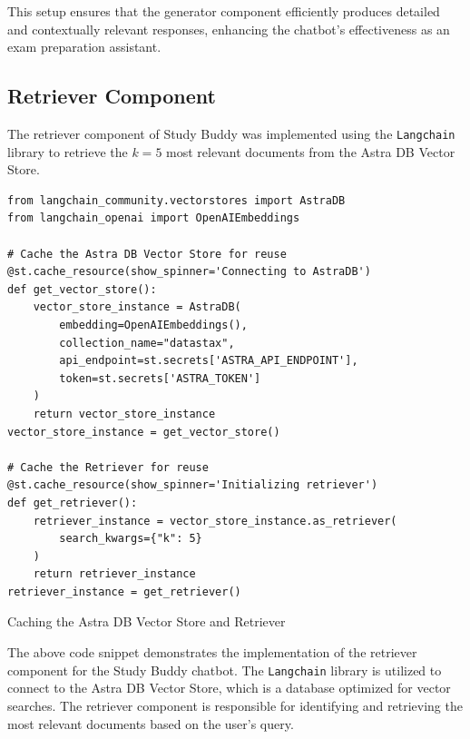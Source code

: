 This setup ensures that the generator component efficiently produces detailed and contextually relevant responses, enhancing the chatbot's effectiveness as an exam preparation assistant.

        
\subsection{Retriever Component}
The retriever component of Study Buddy was implemented using the \texttt{Langchain} library to retrieve the \(k = 5\) most relevant documents from the Astra DB Vector Store.

\begin{listing}[H]
\begin{verbatim}
from langchain_community.vectorstores import AstraDB
from langchain_openai import OpenAIEmbeddings

# Cache the Astra DB Vector Store for reuse
@st.cache_resource(show_spinner='Connecting to AstraDB')
def get_vector_store():
    vector_store_instance = AstraDB(
        embedding=OpenAIEmbeddings(),
        collection_name="datastax",
        api_endpoint=st.secrets['ASTRA_API_ENDPOINT'],
        token=st.secrets['ASTRA_TOKEN']
    )
    return vector_store_instance
vector_store_instance = get_vector_store()

# Cache the Retriever for reuse
@st.cache_resource(show_spinner='Initializing retriever')
def get_retriever():
    retriever_instance = vector_store_instance.as_retriever(
        search_kwargs={"k": 5}
    )
    return retriever_instance
retriever_instance = get_retriever()
\end{verbatim}
\caption{Caching the Astra DB Vector Store and Retriever}
\label{listing:Cache_Retriever}
\end{listing}

The above code snippet demonstrates the implementation of the retriever component for the Study Buddy chatbot. The \texttt{Langchain} library is utilized to connect to the Astra DB Vector Store, which is a database optimized for vector searches. The retriever component is responsible for identifying and retrieving the most relevant documents based on the user's query.

